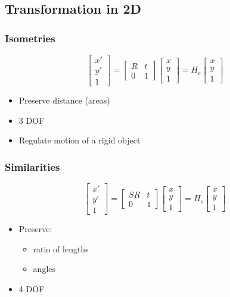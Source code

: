 \subsection{Transformation in 2D}
\subsubsection{Isometries}
$$\begin{bmatrix}
	x' \\ y' \\ 1
\end{bmatrix}=\begin{bmatrix}
	R & t\\ 0 & 1
\end{bmatrix}\begin{bmatrix}
	x \\ y \\  1
\end{bmatrix}=H_e \begin{bmatrix}
	x\\y\\1
\end{bmatrix}$$
\begin{itemize}
	\item Preserve distance (areas)
	\item 3 DOF
	\item Regulate motion of a rigid object
\end{itemize}

\subsubsection{Similarities}
$$\begin{bmatrix}
	x' \\ y' \\ 1
\end{bmatrix}=\begin{bmatrix}
	SR & t\\ 0 & 1
\end{bmatrix}\begin{bmatrix}
	x \\ y \\  1
\end{bmatrix}=H_s \begin{bmatrix}
	x\\y\\1
\end{bmatrix}$$
\begin{itemize}
	\item Preserve:
	\begin{itemize}
		\item ratio of lengths
		\item angles
	\end{itemize}
	\item 4 DOF
\end{itemize}

